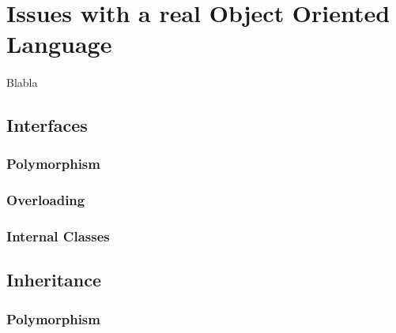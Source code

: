 \documentclass[letterpaper,twocolumn,10pt]{article}
\begin{document}
\section{Issues with a real Object Oriented Language}
\paragraph{}
Blabla

\subsection{Interfaces} \paragraph{}
\subsubsection{Polymorphism} \paragraph{}
\subsubsection{Overloading} \paragraph{}
\subsubsection{Internal Classes} \paragraph{}

\subsection{Inheritance} \paragraph{}
\subsubsection{Polymorphism} \paragraph{}
\end{document}
